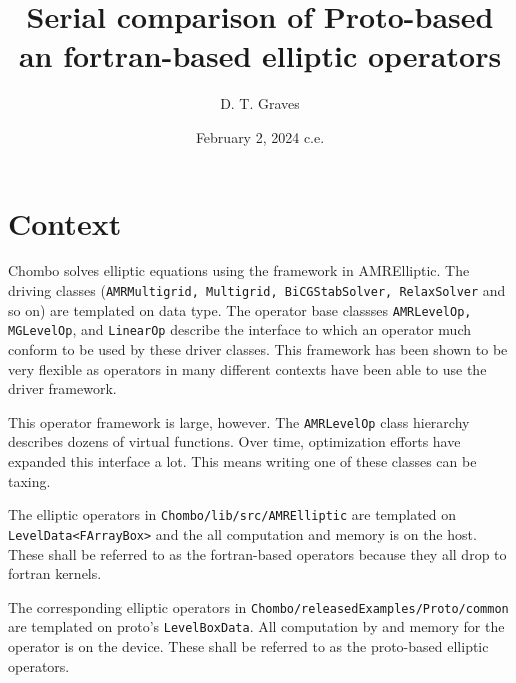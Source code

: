 \documentclass{article}
\begin{document}
\title{Serial comparison of Proto-based an fortran-based elliptic operators}
\author{D. T. Graves   }
\date{February 2, 2024 c.e.}

\maketitle


\section{Context}

Chombo solves elliptic equations using the framework in AMRElliptic.
The driving classes ({\tt AMRMultigrid, Multigrid, BiCGStabSolver,
  RelaxSolver} and so on) are templated on data type.  The operator
base classses {\tt AMRLevelOp, MGLevelOp}, and {\tt LinearOp} describe
the interface to which an operator much conform to be used by these
driver classes.    This framework has been shown to be very flexible
as operators in many different contexts have been able to use the
driver framework.

This operator framework is large, however.   The {\tt AMRLevelOp}
class hierarchy describes dozens of virtual functions.    Over time,
optimization efforts have expanded this interface a lot.  This means
writing  one of these classes can be taxing.

The elliptic operators in {\tt Chombo/lib/src/AMRElliptic}
are templated on  {\tt LevelData<FArrayBox>} and the all computation
and memory is on the host.   These shall be referred to as the
fortran-based  operators because they all drop to fortran kernels.

The corresponding elliptic operators in {\tt  Chombo/releasedExamples/Proto/common}
are templated on proto's {\tt LevelBoxData}.   All computation by and
memory for the operator is  on the device.  These shall be referred to
as the proto-based elliptic operators.
\end{document}
